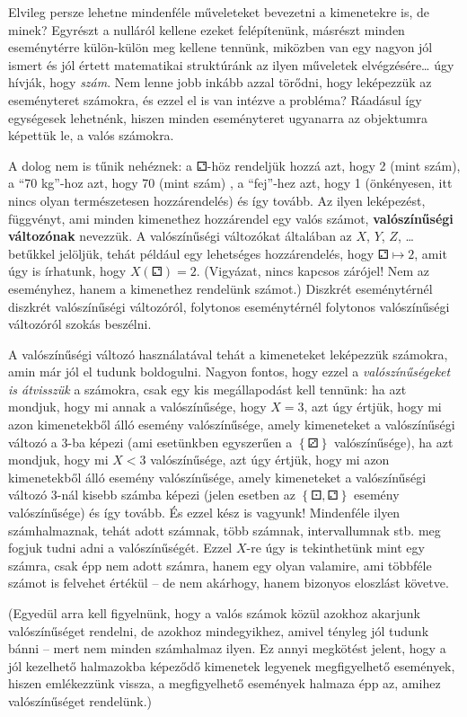 \documentclass[magyar,]{book}
\begin{document}
Elvileg persze lehetne mindenféle műveleteket bevezetni a kimenetekre is, de minek? Egyrészt a nulláról kellene ezeket felépítenünk, másrészt minden eseménytérre külön-külön meg kellene tennünk, miközben van egy nagyon jól ismert és jól értett matematikai struktúránk az ilyen műveletek elvégzésére\ldots{} úgy hívják, hogy \emph{szám}. Nem lenne jobb inkább azzal törődni, hogy leképezzük az eseményteret számokra, és ezzel el is van intézve a probléma? Ráadásul így egységesek lehetnénk, hiszen minden eseményteret ugyanarra az objektumra képettük le, a valós számokra.

A dolog nem is tűnik nehéznek: a ⚁-höz rendeljük hozzá azt, hogy 2 (mint szám), a \enquote{70 kg}-hoz azt, hogy 70 (mint szám) , a \enquote{fej}-hez azt, hogy 1 (önkényesen, itt nincs olyan természetesen hozzárendelés) és így tovább. Az ilyen leképezést, függvényt, ami minden kimenethez hozzárendel egy valós számot, \textbf{valószínűségi változónak} nevezzük. A valószínűségi változókat általában az \(X\), \(Y\), \(Z\), \ldots{} betűkkel jelöljük, tehát például egy lehetséges hozzárendelés, hogy \(⚁\mapsto 2\), amit úgy is írhatunk, hogy \(X\left(⚁\right)=2\). (Vigyázat, nincs kapcsos zárójel! Nem az eseményhez, hanem a kimenethez rendelünk számot.) Diszkrét eseménytérnél diszkrét valószínűségi változóról, folytonos eseménytérnél folytonos valószínűségi változóról szokás beszélni.

A valószínűségi változó használatával tehát a kimeneteket leképezzük számokra, amin már jól el tudunk boldogulni. Nagyon fontos, hogy ezzel a \emph{valószínűségeket is átvisszük} a számokra, csak egy kis megállapodást kell tennünk: ha azt mondjuk, hogy mi annak a valószínűsége, hogy \(X=3\), azt úgy értjük, hogy mi azon kimenetekből álló esemény valószínűsége, amely kimeneteket a valószínűségi változó a 3-ba képezi (ami esetünkben egyszerűen a \(\left\{⚂\right\}\) valószínűsége), ha azt mondjuk, hogy mi \(X<3\) valószínűsége, azt úgy értjük, hogy mi azon kimenetekből álló esemény valószínűsége, amely kimeneteket a valószínűségi változó 3-nál kisebb számba képezi (jelen esetben az \(\left\{⚀,⚁\right\}\) esemény valószínűsége) és így tovább. És ezzel kész is vagyunk! Mindenféle ilyen számhalmaznak, tehát adott számnak, több számnak, intervallumnak stb. meg fogjuk tudni adni a valószínűségét. Ezzel \(X\)-re úgy is tekinthetünk mint egy számra, csak épp nem adott számra, hanem egy olyan valamire, ami többféle számot is felvehet értékül -- de nem akárhogy, hanem bizonyos eloszlást követve.

(Egyedül arra kell figyelnünk, hogy a valós számok közül azokhoz akarjunk valószínűséget rendelni, de azokhoz mindegyikhez, amivel tényleg jól tudunk bánni -- mert nem minden számhalmaz ilyen. Ez annyi megkötést jelent, hogy a jól kezelhető halmazokba képeződő kimenetek legyenek megfigyelhető események, hiszen emlékezzünk vissza, a megfigyelhető események halmaza épp az, amihez valószínűséget rendelünk.)
\end{document}
